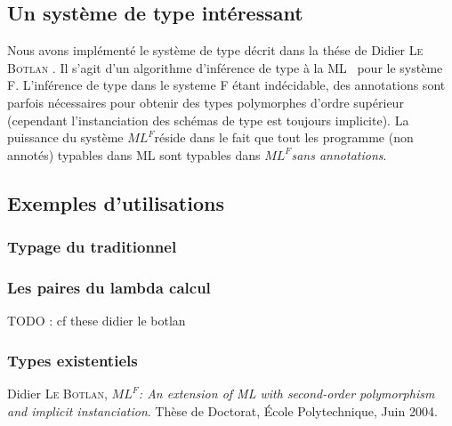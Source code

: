 \documentclass[a4paper]{article}
\def\mlf{$ML^F$}
\begin{document}
\subsection{Un système de type intéressant}

Nous avons implémenté le système de type décrit dans la thése de
Didier \textsc{Le Botlan} \cite{lebotlan}. Il s'agit
d'un algorithme d'inférence de type \og à la ML \fg~pour le système F.
L'inférence de type dans le systeme F étant indécidable, des
annotations sont parfois nécessaires pour obtenir des types polymorphes
d'ordre supérieur (cependant l'instanciation des schémas de type est
toujours implicite). La puissance du système \mlf réside dans le fait
que tout les programme (non annotés) typables dans ML sont typables
dans \mlf \emph{sans annotations}.

\subsection{Exemples d'utilisations}

\subsubsection{Typage du traditionnel}

\subsubsection{Les paires du lambda calcul}
TODO : cf these didier le botlan

\subsubsection{Types existentiels}

\begin{thebibliography}{1}

  Didier \textsc{Le Botlan},
  \emph{\mlf : An extension of ML with second-order polymorphism and
    implicit instanciation}.
  Thèse de Doctorat,
  École Polytechnique,
  Juin 2004.

\end{thebibliography}
\end{document}
